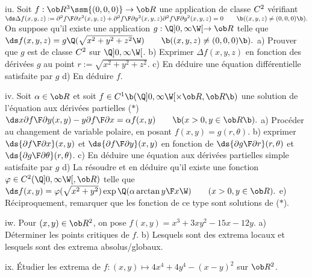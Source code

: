 \exo [Level=2,Fight=2,Learn=2,Type=\TravauxDirigés,Field=\EquationsAuxDérivéesPartielles,Origin=] iu. 
Soit $f:\ob R^3\ssm\{(0,0,0)\}\to\ob R$ une application de classe $\sc C^2$ 
vérifiant 
\medskip\hfill$\ds 
\Delta f(x,y,z):={\partial^2f\F\partial x^2}(x,y,z)
+{\partial^2f\F\partial y^2}(x,y,z){\partial^2f\F\partial y^2}(x,y,z)=0\qquad\b((x,y,z)\neq(0,0,0)\b). 
$\hfill\null\medskip\noindent
On suppose qu'il existe une application $g:\Q]0,\infty\W[\to\ob R$ telle que 
\medskip\hfill$\ds 
f(x,y,z)=g\Q(\sqrt{x^2+y^2+z^2}\W)\qquad\b((x,y,z)\neq(0,0,0)\b).
$\hfill\null\medskip\noindent
a) Prouver que $g$ est de classe $\sc C^2$ sur $\Q]0,\infty\W[$. \smallskip
\noindent
b) Exprimer $\Delta f(x,y,z)$ en fonction des dérivées $g$ au point $r:=\sqrt{x^2+y^2+z^2}$. 
\smallskip\noindent 
c) En déduire une équation différentielle satisfaite par $g$
\smallskip\noindent
d) En déduire $f$. 

\exo [Level=2,Fight=2,Learn=2,Type=\TravauxDirigés,Field=\EquationsAuxDérivéesPartielles,Origin=] iv. 
Soit $\alpha\in\ob R$ et soit $f\in\sc C^1\b(\Q]0,\infty\W[\times\ob R,\ob R\b)$ une solution 
de l'équation aux dérivées partielles 
\medskip\noindent($*$)\hfill$\ds 
x{\partial f\F\partial y}(x,y)-y{\partial f\F\partial x}=\alpha f(x,y)\qquad\b(x>0,y\in\ob R\b).
$\hfill\null\medskip\noindent 
a) Procéder au changement de variable polaire, en posant $f(x,y)=g(r,\theta)$. 
\medskip\noindent
b) exprimer $\ds{\partial f\F\partial x}(x,y)$ et $\ds{\partial f\F\partial y}(x,y)$ en fonction de 
$\ds{\partial g\F\partial r}(r,\theta)$ et $\ds{\partial g\F\partial\theta}(r,\theta)$. 
\medskip\noindent
c) En déduire une équation aux dérivées partielles simple satisfaite par $g$
\medskip\noindent
d) La résoudre et en déduire qu'il existe 
une fonction $\varphi\in\sc C^2(\Q]0,\infty\W[,\ob R)$ telle que 
\medskip\hfill$\ds 
f(x,y)=\varphi(\sqrt{x^2+y^2})\exp\Q(\alpha\arctan{y\F x}\W)\qquad(x>0,y\in\ob R). 
$\hfill\null\medskip\noindent 
e) Réciproquement, remarquer que les fonction de ce type sont solutions de ($*$). 

\exo [Level=2,Fight=1,Learn=1,Type=\Exercices,Field=\Extrema,Origin=] iw. 
Pour $(x,y)\in\ob R^2$, on pose $f(x,y)=x^3+3xy^2-15x-12y$. \pn
a) Déterminer les points critiques de $f$. \pn
b) Lesquels sont des extrema locaux et lesquels 
sont des extrema absolus/globaux. 

\exo [Level=2,Fight=1,Learn=1,Type=\Exercices,Field=\Extrema,Origin=] ix. 
\'Etudier les extrema de $f:(x,y)\mapsto 4x^4+4y^4-(x-y)^2$ sur $\ob R^2$. 


